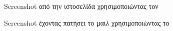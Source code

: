 \documentclass{assignment}
\begin{document}
\begin{figure}
\begin{center}
\caption{Screenshot από την ιστοσελίδα χρησιμοποιώντας τον  }
\label{fig:site}
\end{center}
\end{figure}

\begin{figure}
\begin{center}
\caption{Screenshot έχοντας πατήσει το μαιλ χρησιμοποιώντας το  }
\label{fig:mail}
\end{center}
\end{figure}



\newpage

%
%
\end{document}
